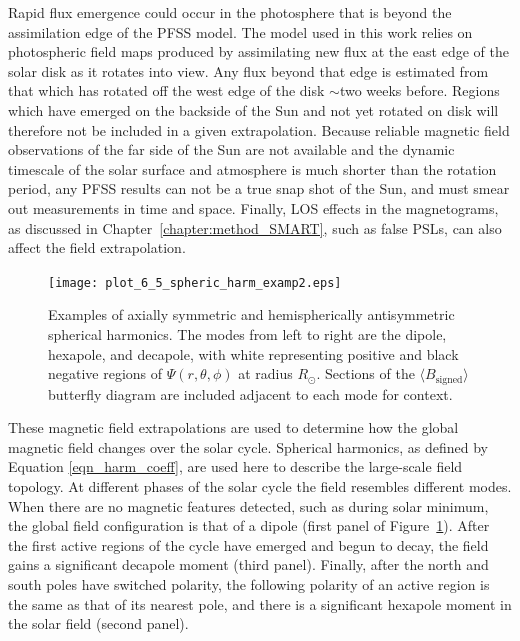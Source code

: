 Rapid flux emergence could occur in the photosphere that is beyond the assimilation edge of the \gls{PFSS} model. The model used in this work relies on photospheric field maps produced by assimilating new flux at the east edge of the solar disk as it rotates into view. Any flux beyond that edge is estimated from that which has rotated off the west edge of the disk $\sim$two weeks before. Regions which have emerged on the backside of the Sun and not yet rotated on disk will therefore not be included in a given extrapolation. Because reliable magnetic field observations of the far side of the Sun are not available and the dynamic timescale of the solar surface and atmosphere is much shorter than the rotation period, any \gls{PFSS} results can not be a true snap shot of the Sun, and must smear out measurements in time and space. Finally, \gls{LOS} effects in the magnetograms, as discussed in Chapter~\ref{chapter:method_SMART}, such as false \glspl{PSL}, can also affect the field extrapolation.

\begin{figure}[!t]
\centerline{\texttt{[image: plot\_6\_5\_spheric\_harm\_examp2.eps]}}
\caption[Spherical harmonic visualisations.]{Examples of axially symmetric and hemispherically antisymmetric spherical harmonics. The modes from left to right are the dipole, hexapole, and decapole, with white representing positive and black negative regions of $\Psi(r,\theta,\phi)$ at radius $R_{\odot}$. Sections of the $\langle B_{\mathrm{signed}} \rangle$ butterfly diagram are included adjacent to each mode for context.}
\label{plot_6_5_spheric_harm_examp}
\end{figure}

These magnetic field extrapolations are used to determine how the global magnetic field changes over the solar cycle. Spherical harmonics, as defined by Equation \ref{eqn_harm_coeff}, are used here to describe the large-scale field topology. At different phases of the solar cycle the field resembles different modes. When there are no magnetic features detected, such as during solar minimum, the global field configuration is that of a dipole (first panel of Figure~\ref{plot_6_5_spheric_harm_examp}). After the first active regions of the cycle have emerged and begun to decay, the field gains a significant decapole moment (third panel). Finally, after the north and south poles have switched polarity, the following polarity of an active region is the same as that of its nearest pole, and there is a significant hexapole moment in the solar field (second panel).


